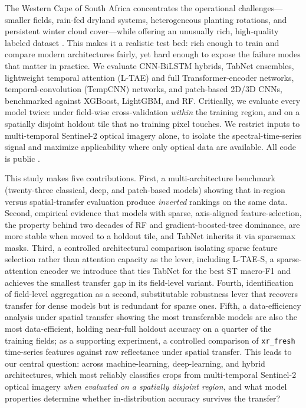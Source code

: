 \documentclass[journal]{IEEEtran}
\begin{document}
The Western Cape of South Africa concentrates the operational challenges---smaller fields, rain-fed dryland systems, heterogeneous planting rotations, and persistent winter cloud cover---while offering an unusually rich, high-quality labeled dataset \cite{mlhub}. This makes it a realistic test bed: rich enough to train and compare modern architectures fairly, yet hard enough to expose the failure modes that matter in practice. We evaluate CNN-BiLSTM hybrids, TabNet ensembles, lightweight temporal attention (L-TAE) and full Transformer-encoder networks, temporal-convolution (TempCNN) networks, and patch-based 2D/3D CNNs, benchmarked against XGBoost, LightGBM, and RF. Critically, we evaluate every model twice: under field-wise cross-validation \emph{within} the training region, and on a spatially disjoint holdout tile that no training pixel touches. We restrict inputs to multi-temporal Sentinel-2 optical imagery alone, to isolate the spectral-time-series signal and maximize applicability where only optical data are available. All code is public \cite{primary_repo}.

This study makes five contributions. First, a multi-architecture benchmark (twenty-three classical, deep, and patch-based models) showing that in-region versus spatial-transfer evaluation produce \emph{inverted} rankings on the same data. Second, empirical evidence that models with sparse, axis-aligned feature-selection, the property behind two decades of RF and gradient-boosted-tree dominance, are more stable when moved to a holdout tile, and TabNet inherits it via sparsemax masks. Third, a controlled architectural comparison isolating sparse feature selection rather than attention capacity as the lever, including L-TAE-S, a sparse-attention encoder we introduce that ties TabNet for the best ST macro-F1 and achieves the smallest transfer gap in its field-level variant. Fourth, identification of field-level aggregation as a second, substitutable robustness lever that recovers transfer for dense models but is redundant for sparse ones. Fifth, a data-efficiency analysis under spatial transfer showing the most transferable models are also the most data-efficient, holding near-full holdout accuracy on a quarter of the training fields; as a supporting experiment, a controlled comparison of \texttt{xr\_fresh} time-series features against raw reflectance under spatial transfer. This leads to our central question: across machine-learning, deep-learning, and hybrid architectures, which most reliably classifies crops from multi-temporal Sentinel-2 optical imagery \emph{when evaluated on a spatially disjoint region}, and what model properties determine whether in-distribution accuracy survives the transfer?
\end{document}
